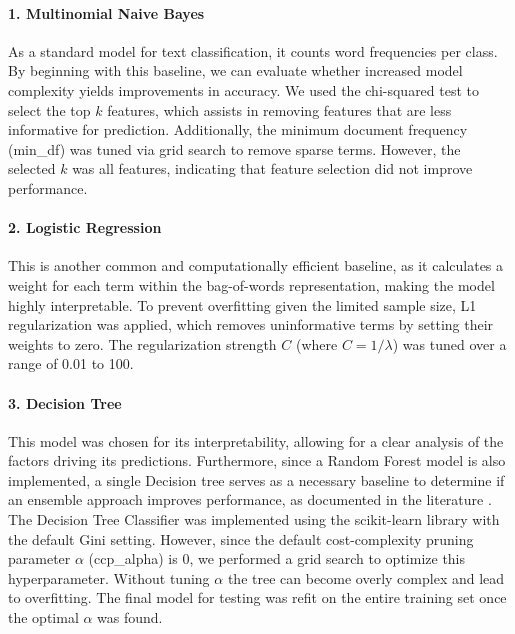\documentclass[pmlr]{jmlr}%
\begin{document}
\paragraph{1. Multinomial Naive Bayes}
As a standard model for text classification, it counts word frequencies per class.
By beginning with this baseline, we can evaluate whether increased model complexity yields improvements in accuracy.
We used the chi-squared test to select the top $k$ features, which assists in removing features that are less informative for prediction.
Additionally, the minimum document frequency (min\_df) was tuned via grid search to remove sparse terms.
However, the selected $k$ was all features, indicating that feature selection did not improve performance.

\paragraph{2. Logistic Regression}
This is another common and computationally efficient baseline, as it calculates a weight for each term within the bag-of-words representation, making the model highly interpretable.
To prevent overfitting given the limited sample size, L1 regularization was applied, which removes uninformative terms by setting their weights to zero.
The regularization strength $C$ (where $C = 1/\lambda$) was tuned over a range of 0.01 to 100.

\paragraph{3. Decision Tree}
This model was chosen for its interpretability, allowing for a clear analysis of the factors driving its predictions.
Furthermore, since a Random Forest model is also implemented, a single Decision tree serves as a necessary baseline to determine if an ensemble approach improves performance, as documented in the literature \citep{Breiman2001}.
The Decision Tree Classifier was implemented using the scikit-learn library with the default Gini setting.
However, since the default cost-complexity pruning parameter $\alpha$ (ccp\_alpha) is 0, we performed a grid search to optimize this hyperparameter.
Without tuning $\alpha$ the tree can become overly complex and lead to overfitting.
The final model for testing was refit on the entire training set once the optimal $\alpha$ was found. 
\end{document}
